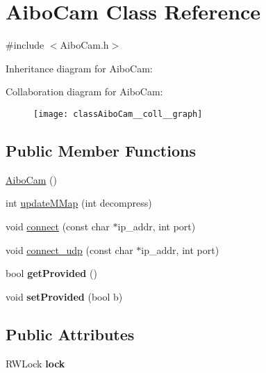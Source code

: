 \hypertarget{classAiboCam}{
\section{AiboCam Class Reference}
\label{classAiboCam}
}


{\ttfamily \#include $<$AiboCam.h$>$}



Inheritance diagram for AiboCam:

Collaboration diagram for AiboCam:\nopagebreak
\begin{figure}[H]
\begin{center}
\leavevmode
\texttt{[image: classAiboCam\_\_coll\_\_graph]}
\end{center}
\end{figure}
\subsection*{Public Member Functions}
\begin{DoxyCompactItemize}
\item 
\hyperlink{classAiboCam_a594411a1df57552aa2b9c609319c74d4}{AiboCam} ()
\item 
int \hyperlink{classAiboCam_a72162af9d25b9b24d6449d41b234f8b2}{updateMMap} (int decompress)
\item 
void \hyperlink{classAiboCam_ad75cf19864fb15ed89a616368d1ee200}{connect} (const char $\ast$ip\_\-addr, int port)
\item 
void \hyperlink{classAiboCam_a96cac8c22b3676e4bfd71651af3cf825}{connect\_\-udp} (const char $\ast$ip\_\-addr, int port)
\item 
\hypertarget{classAiboCam_a27ac8c9cb0be12e2ae722bd04b1b7747}{
bool {\bfseries getProvided} ()}
\label{classAiboCam_a27ac8c9cb0be12e2ae722bd04b1b7747}

\item 
\hypertarget{classAiboCam_a3e21fa4560997a25adbf7b79572e249b}{
void {\bfseries setProvided} (bool b)}
\label{classAiboCam_a3e21fa4560997a25adbf7b79572e249b}

\end{DoxyCompactItemize}
\subsection*{Public Attributes}
\begin{DoxyCompactItemize}
\item 
\hypertarget{classAiboCam_aa865c8168614456624bdea87b5cd8a71}{
RWLock {\bfseries lock}}
\label{classAiboCam_aa865c8168614456624bdea87b5cd8a71}

\end{DoxyCompactItemize}


